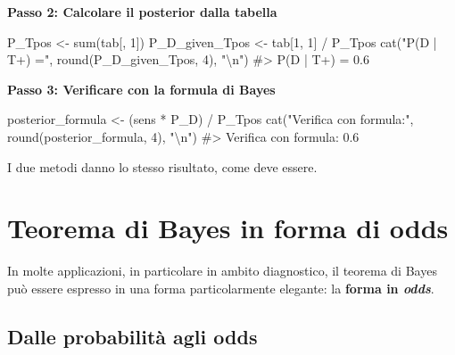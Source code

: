 \documentclass[
  italian,
  letterpaper,
  a4paper,
  11pt,
  open=any]{scrbook}
\newenvironment{Shaded}{\begin{snugshade}}{\end{snugshade}}
\newcommand{\CommentTok}[1]{\textcolor[rgb]{0.37,0.37,0.37}{#1}}
\newcommand{\DecValTok}[1]{\textcolor[rgb]{0.68,0.00,0.00}{#1}}
\newcommand{\FunctionTok}[1]{\textcolor[rgb]{0.28,0.35,0.67}{#1}}
\newcommand{\NormalTok}[1]{\textcolor[rgb]{0.00,0.23,0.31}{#1}}
\newcommand{\OtherTok}[1]{\textcolor[rgb]{0.00,0.23,0.31}{#1}}
\newcommand{\SpecialCharTok}[1]{\textcolor[rgb]{0.37,0.37,0.37}{#1}}
\newcommand{\StringTok}[1]{\textcolor[rgb]{0.13,0.47,0.30}{#1}}
\theoremstyle{plain}
\theoremstyle{definition}
\theoremstyle{definition}
\theoremstyle{remark}
\begin{document}
\begin{tcolorbox}
\textbf{Passo 2: Calcolare il posterior dalla tabella}

\begin{Shaded}
\begin{Highlighting}[]
\NormalTok{P\_Tpos }\OtherTok{\textless{}{-}} \FunctionTok{sum}\NormalTok{(tab[, }\DecValTok{1}\NormalTok{])}
\NormalTok{P\_D\_given\_Tpos }\OtherTok{\textless{}{-}}\NormalTok{ tab[}\DecValTok{1}\NormalTok{, }\DecValTok{1}\NormalTok{] }\SpecialCharTok{/}\NormalTok{ P\_Tpos}
\FunctionTok{cat}\NormalTok{(}\StringTok{"P(D | T+) ="}\NormalTok{, }\FunctionTok{round}\NormalTok{(P\_D\_given\_Tpos, }\DecValTok{4}\NormalTok{), }\StringTok{"}\SpecialCharTok{\textbackslash{}n}\StringTok{"}\NormalTok{)}
\CommentTok{\#\textgreater{} P(D | T+) = 0.6}
\end{Highlighting}
\end{Shaded}

\textbf{Passo 3: Verificare con la formula di Bayes}

\begin{Shaded}
\begin{Highlighting}[]
\NormalTok{posterior\_formula }\OtherTok{\textless{}{-}}\NormalTok{ (sens }\SpecialCharTok{*}\NormalTok{ P\_D) }\SpecialCharTok{/}\NormalTok{ P\_Tpos}
\FunctionTok{cat}\NormalTok{(}\StringTok{"Verifica con formula:"}\NormalTok{, }\FunctionTok{round}\NormalTok{(posterior\_formula, }\DecValTok{4}\NormalTok{), }\StringTok{"}\SpecialCharTok{\textbackslash{}n}\StringTok{"}\NormalTok{)}
\CommentTok{\#\textgreater{} Verifica con formula: 0.6}
\end{Highlighting}
\end{Shaded}

I due metodi danno lo stesso risultato, come deve essere.

\end{tcolorbox}

\section{Teorema di Bayes in forma di odds}\label{sec-bayes-odds}

In molte applicazioni, in particolare in ambito diagnostico, il teorema
di Bayes può essere espresso in una forma particolarmente elegante: la
\textbf{forma in \emph{odds}}.

\subsection{Dalle probabilità agli
odds}\label{dalle-probabilituxe0-agli-odds}
\end{document}
